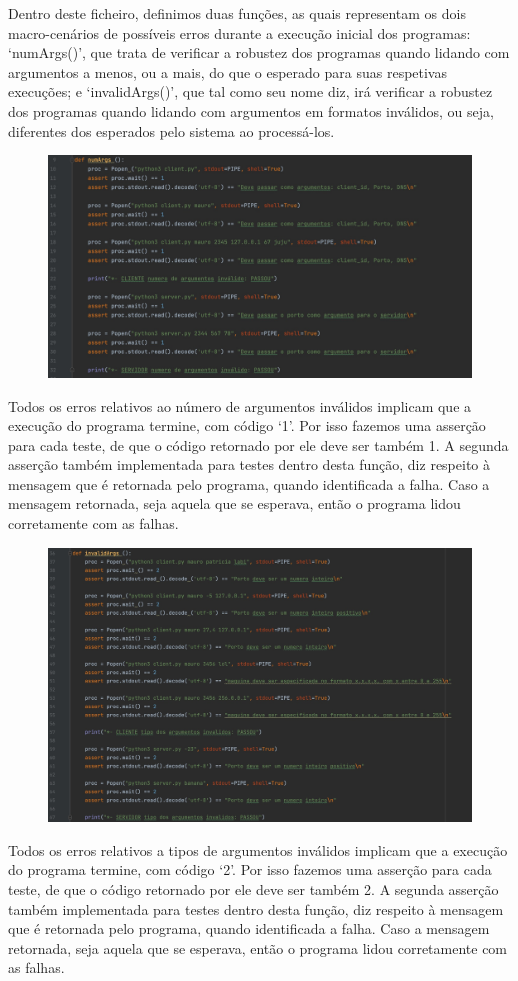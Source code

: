 \documentclass{report}
\begin{document}
Dentro deste ficheiro, definimos duas funções, as quais representam os dois macro-cenários de possíveis erros durante a execução inicial dos programas: ‘numArgs()’, que trata de verificar a robustez dos programas quando lidando com argumentos a menos, ou a mais, do que
o esperado para suas respetivas execuções; e ‘invalidArgs()’, que tal como seu nome diz, irá verificar a robustez dos programas quando lidando com argumentos em formatos inválidos, ou seja, diferentes dos esperados pelo sistema ao processá-los.
\begin{figure}[H]
        \centering
        \includegraphics[scale=0.20]{testefuncional}      
\end{figure}
Todos os erros relativos ao número de argumentos inválidos implicam que a execução do programa termine, com código ‘1’. Por isso fazemos uma asserção para cada teste, de que o código retornado por ele deve ser também 1. A segunda asserção também implementada para testes dentro desta função, diz respeito à mensagem que é retornada pelo programa, quando identificada a falha. Caso a mensagem retornada, seja aquela que se esperava, então o programa
lidou corretamente com as falhas.
\begin{figure}[H]
        \centering
        \includegraphics[scale=0.20]{testefuncional1}      
\end{figure}
Todos os erros relativos a tipos de argumentos inválidos implicam que a execução do programa termine, com código ‘2’. Por isso fazemos uma asserção para cada teste, de que o código retornado por ele deve ser também 2. A segunda asserção também implementada para testes dentro desta função, diz respeito à mensagem que é retornada pelo programa, quando identificada a falha. Caso a mensagem retornada, seja aquela que se esperava, então o programa lidou corretamente com as falhas.
\end{document}
